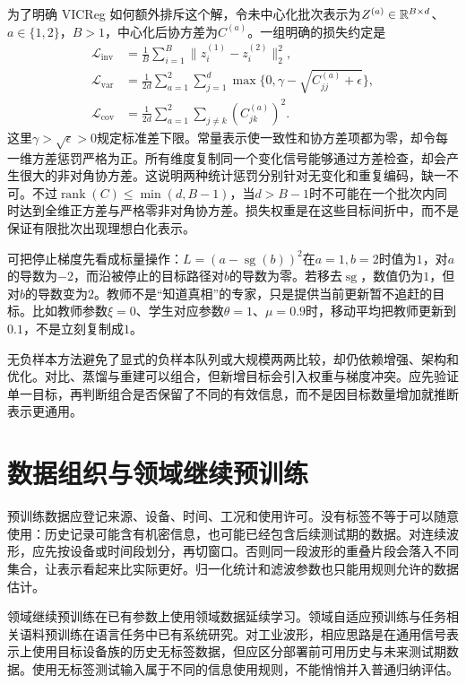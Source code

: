 为了明确 VICReg 如何额外排斥这个解，令未中心化批次表示为$Z^{(a)}\in\mathbb{R}^{B\times d}$、$a\in\{1,2\}$，$B>1$，中心化后协方差为$C^{(a)}$。一组明确的损失约定是
\begin{align}
 \mathcal L_{\mathrm{inv}}&=\frac1B\sum_{i=1}^B\|z_i^{(1)}-z_i^{(2)}\|_2^2,\\
 \mathcal L_{\mathrm{var}}&=\frac1{2d}\sum_{a=1}^2\sum_{j=1}^d
 \max\{0,\gamma-\sqrt{C_{jj}^{(a)}+\epsilon}\},\\
 \mathcal L_{\mathrm{cov}}&=\frac1{2d}\sum_{a=1}^2\sum_{j\ne k}(C_{jk}^{(a)})^2.
\end{align}
这里$\gamma>\sqrt\epsilon>0$规定标准差下限。常量表示使一致性和协方差项都为零，却令每一维方差惩罚严格为正。所有维度复制同一个变化信号能够通过方差检查，却会产生很大的非对角协方差。这说明两种统计惩罚分别针对无变化和重复编码，缺一不可。不过$\operatorname{rank}(C)\leq\min(d,B-1)$，当$d>B-1$时不可能在一个批次内同时达到全维正方差与严格零非对角协方差。损失权重是在这些目标间折中，而不是保证有限批次出现理想白化表示。

可把停止梯度先看成标量操作：$L=(a-\operatorname{sg}(b))^2$在$a=1,b=2$时值为$1$，对$a$的导数为$-2$，而沿被停止的目标路径对$b$的导数为零。若移去$\operatorname{sg}$，数值仍为$1$，但对$b$的导数变为$2$。教师不是“知道真相”的专家，只是提供当前更新暂不追赶的目标。比如教师参数$\xi=0$、学生对应参数$\theta=1$、$\mu=0.9$时，移动平均把教师更新到$0.1$，不是立刻复制成$1$。

无负样本方法避免了显式的负样本队列或大规模两两比较，却仍依赖增强、架构和优化。对比、蒸馏与重建可以组合，但新增目标会引入权重与梯度冲突。应先验证单一目标，再判断组合是否保留了不同的有效信息，而不是因目标数量增加就推断表示更通用。

\section{数据组织与领域继续预训练}
预训练数据应登记来源、设备、时间、工况和使用许可。没有标签不等于可以随意使用：历史记录可能含有机密信息，也可能已经包含后续测试期的数据。对连续波形，应先按设备或时间段划分，再切窗口。否则同一段波形的重叠片段会落入不同集合，让表示看起来比实际更好。归一化统计和滤波参数也只能用规则允许的数据估计。

领域继续预训练在已有参数上使用领域数据延续学习。领域自适应预训练与任务相关语料预训练在语言任务中已有系统研究\cite{gururangan2020dontstop}。对工业波形，相应思路是在通用信号表示上使用目标设备族的历史无标签数据，但应区分部署前可用历史与未来测试期数据。使用无标签测试输入属于不同的信息使用规则，不能悄悄并入普通归纳评估。

